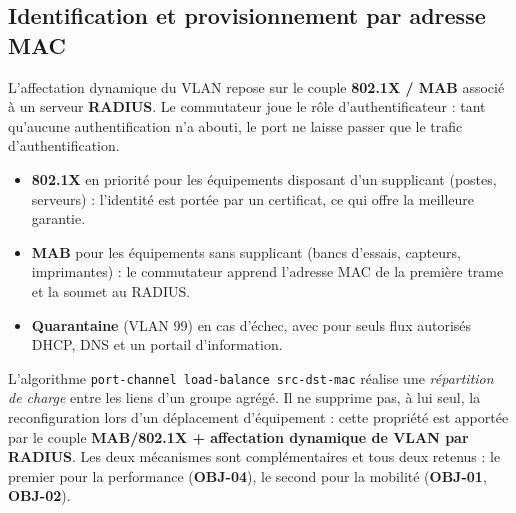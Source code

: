 \documentclass[11pt,a4paper]{article}
\newcommand{\ttb}[1]{\texttt{\small #1}}
\newcommand{\rid}[1]{\textcolor{primary}{\textbf{\small #1}}}
\begin{document}
\subsection{Identification et provisionnement par adresse MAC}
L'affectation dynamique du VLAN repose sur le couple \textbf{802.1X / MAB} associé à un serveur \textbf{RADIUS}. Le commutateur joue le rôle d'authentificateur : tant qu'aucune authentification n'a abouti, le port ne laisse passer que le trafic d'authentification.

\begin{itemize}[leftmargin=*,itemsep=1pt,topsep=2pt]
\item \textbf{802.1X} en priorité pour les équipements disposant d'un supplicant (postes, serveurs) : l'identité est portée par un certificat, ce qui offre la meilleure garantie.
\item \textbf{MAB} pour les équipements sans supplicant (bancs d'essais, capteurs, imprimantes) : le commutateur apprend l'adresse MAC de la première trame et la soumet au RADIUS.
\item \textbf{Quarantaine} (VLAN 99) en cas d'échec, avec pour seuls flux autorisés DHCP, DNS et un portail d'information.
\end{itemize}

\begin{notebox}
L'algorithme \ttb{port-channel load-balance src-dst-mac} réalise une \emph{répartition de charge} entre les liens d'un groupe agrégé. Il ne supprime pas, à lui seul, la reconfiguration lors d'un déplacement d'équipement : cette propriété est apportée par le couple \textbf{MAB/802.1X + affectation dynamique de VLAN par RADIUS}. Les deux mécanismes sont complémentaires et tous deux retenus : le premier pour la performance (\rid{OBJ-04}), le second pour la mobilité (\rid{OBJ-01}, \rid{OBJ-02}).
\end{notebox}
\end{document}
